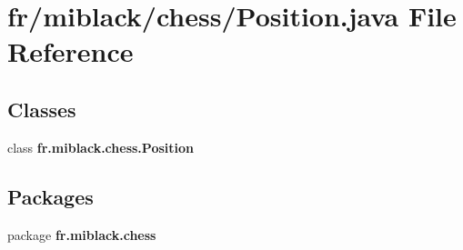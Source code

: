 \section{fr/miblack/chess/\-Position.java File Reference}
\label{Position_8java}
\subsection*{Classes}
\begin{DoxyCompactItemize}
\item 
class {\bf fr.\-miblack.\-chess.\-Position}
\end{DoxyCompactItemize}
\subsection*{Packages}
\begin{DoxyCompactItemize}
\item 
package {\bf fr.\-miblack.\-chess}
\end{DoxyCompactItemize}
